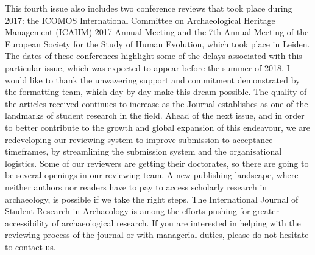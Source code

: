 This fourth issue also includes two conference reviews that took place during 2017: the ICOMOS International Committee on Archaeological Heritage Management (ICAHM) 2017 Annual Meeting and the 7th Annual Meeting of the European Society for the Study of Human Evolution, which took place in Leiden. The dates of these conferences highlight some of the delays associated with this particular issue, which was expected to appear before the summer of 2018. I would like to thank the unwavering support and commitment demonstrated by the formatting team, which day by day make this dream possible. The quality of the articles received continues to increase as the Journal establishes as one of the landmarks of student research in the field. Ahead of the next issue, and in order to better contribute to the growth and global expansion of this endeavour, we are redeveloping our reviewing system to improve submission to acceptance timeframes, by streamlining the submission system and the organisational logistics. Some of our reviewers are getting their doctorates, so there are going to be several openings in our reviewing team. A new publishing landscape, where neither authors nor readers have to pay to access scholarly research in archaeology, is possible if we take the right steps. The International Journal of Student Research in Archaeology is among the efforts pushing for greater accessibility of archaeological research. If you are interested in helping with the reviewing process of the journal or with managerial duties, please do not hesitate to contact us.


\IJSRAclosing%
